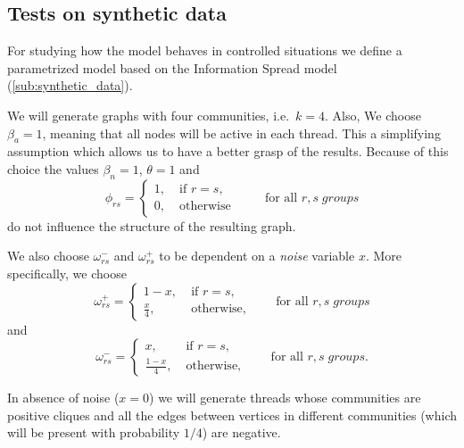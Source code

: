 \subsection{Tests on synthetic data}%
\label{sub:testing_on_synthetic_data}

For studying how the model behaves in controlled situations we define a
parametrized model based on the Information Spread model
(\autoref{sub:synthetic_data}).

We will generate graphs with four communities, i.e.\ $k= 4$. Also, We choose $\beta _{a} = 1$, meaning that all nodes will be active in each
thread. This a
simplifying assumption which allows us to have a better grasp of the results.
Because of this choice the values $\beta _n = 1$, $\theta = 1$ and
\begin{equation}
	\phi_{rs}  =
	\begin{cases}
		1, \; & \text{if } r = s, \\
		0, \; & \text{otherwise }
	\end{cases} \quad\quad \text{for all } r,s \; groups
\end{equation}
do not influence the structure of the resulting graph.

We also choose $\omega ^{-} _{rs}$ and $\omega ^{+} _{rs} $ to be dependent on
a \emph{noise} variable $x$. More specifically, we choose
\begin{equation}
	\omega_{rs}^{+}   =
	\begin{cases}
		1 - x, \;        & \text{if } r = s, \\
		\frac{x}{4},  \; & \text{otherwise,}
	\end{cases} \quad\quad \text{for all } r,s \; groups
\end{equation}
and
\begin{equation}
	\omega_{rs}^{-}   =
	\begin{cases}
		x, \;                & \text{if } r = s, \\
		\frac{1 - x}{4},  \; & \text{otherwise,}
	\end{cases} \quad\quad \text{for all } r,s \; groups.
\end{equation}

In absence of noise ($x = 0$) we will generate threads whose communities are
positive cliques and all the edges between vertices in different communities
(which will be present with probability $1/4$) are negative.


